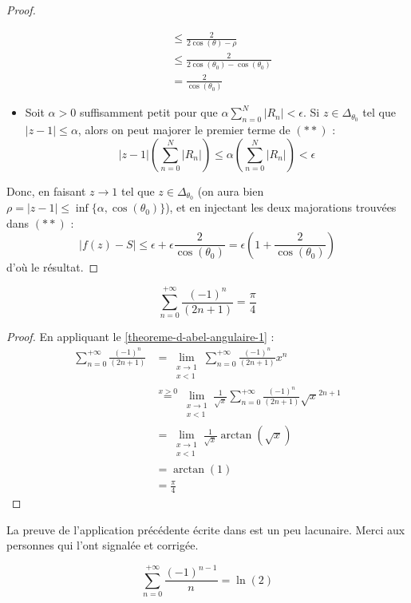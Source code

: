 \begin{proof}
\begin{itemize}
\begin{align*}
        &\leq \frac{2}{2\cos(\theta) - \rho} \\
        &\leq \frac{2}{2\cos(\theta_0) - \cos(\theta_0)} \\
        &= \frac{2}{\cos(\theta_0)}
      \end{align*}
      \item Soit $\alpha > 0$ suffisamment petit pour que $\alpha \sum_{n=0}^N |R_n| < \epsilon$. Si $z \in \Delta_{\theta_0}$ tel que $|z-1| \leq \alpha$, alors on peut majorer le premier terme de $(**)$ :
      \[ |z-1| \left( \sum_{n=0}^N |R_n| \right) \leq \alpha \left( \sum_{n=0}^N |R_n| \right) < \epsilon \]
    \end{itemize}
    Donc, en faisant $z \longrightarrow 1$ tel que $z \in \Delta_{\theta_0}$ (on aura bien $\rho = |z-1| \leq \inf \{ \alpha, \cos(\theta_0) \}$), et en injectant les deux majorations trouvées dans $(**)$ :
    \[ |f(z)-S| \leq \epsilon + \epsilon \frac{2}{\cos(\theta_0)} = \epsilon \left(1 + \frac{2}{\cos(\theta_0)} \right) \]
    d'où le résultat.
  \end{proof}

  \begin{application}
    \[ \sum_{n=0}^{+\infty} \frac{(-1)^n}{(2n+1)} = \frac{\pi}{4} \]
  \end{application}

  \begin{proof}
    En appliquant le \cref{theoreme-d-abel-angulaire-1} :
    \begin{align*}
      \sum_{n=0}^{+\infty} \frac{(-1)^n}{(2n+1)} &= \lim_{\substack{x \rightarrow 1 \\ x < 1}} \sum_{n=0}^{+\infty} \frac{(-1)^n}{(2n+1)} x^n \\
      &\overset{x > 0}{=} \lim_{\substack{x \rightarrow 1 \\ x < 1}} \frac{1}{\sqrt{x}} \sum_{n=0}^{+\infty} \frac{(-1)^n}{(2n+1)} \sqrt{x}^{2n+1} \\
      &= \lim_{\substack{x \rightarrow 1 \\ x < 1}} \frac{1}{\sqrt{x}} \arctan(\sqrt{x}) \\
      &= \arctan(1) \\
      &= \frac{\pi}{4}
    \end{align*}
  \end{proof}

  La preuve de l'application précédente écrite dans \cite{[GOU20]} est un peu lacunaire. Merci aux personnes qui l'ont signalée et corrigée.

  \begin{application}
    \[ \sum_{n=0}^{+\infty} \frac{(-1)^{n-1}}{n} = \ln(2) \]
  \end{application}

